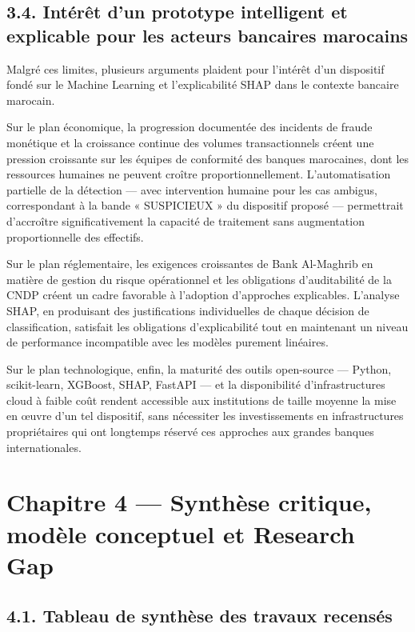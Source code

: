 \section{3.4. Intérêt d'un prototype intelligent et explicable pour les acteurs bancaires marocains}

Malgré ces limites, plusieurs arguments plaident pour l'intérêt d'un dispositif fondé sur le Machine Learning et l'explicabilité SHAP dans le contexte bancaire marocain.

Sur le plan économique, la progression documentée des incidents de fraude monétique et la croissance continue des volumes transactionnels créent une pression croissante sur les équipes de conformité des banques marocaines, dont les ressources humaines ne peuvent croître proportionnellement. L'automatisation partielle de la détection — avec intervention humaine pour les cas ambigus, correspondant à la bande « SUSPICIEUX » du dispositif proposé — permettrait d'accroître significativement la capacité de traitement sans augmentation proportionnelle des effectifs.

Sur le plan réglementaire, les exigences croissantes de Bank Al-Maghrib en matière de gestion du risque opérationnel et les obligations d'auditabilité de la CNDP créent un cadre favorable à l'adoption d'approches explicables. L'analyse SHAP, en produisant des justifications individuelles de chaque décision de classification, satisfait les obligations d'explicabilité tout en maintenant un niveau de performance incompatible avec les modèles purement linéaires.

Sur le plan technologique, enfin, la maturité des outils open-source — Python, scikit-learn, XGBoost, SHAP, FastAPI — et la disponibilité d'infrastructures cloud à faible coût rendent accessible aux institutions de taille moyenne la mise en œuvre d'un tel dispositif, sans nécessiter les investissements en infrastructures propriétaires qui ont longtemps réservé ces approches aux grandes banques internationales.

\chapter{Chapitre 4 — Synthèse critique, modèle conceptuel et Research Gap}

\section{4.1. Tableau de synthèse des travaux recensés}

